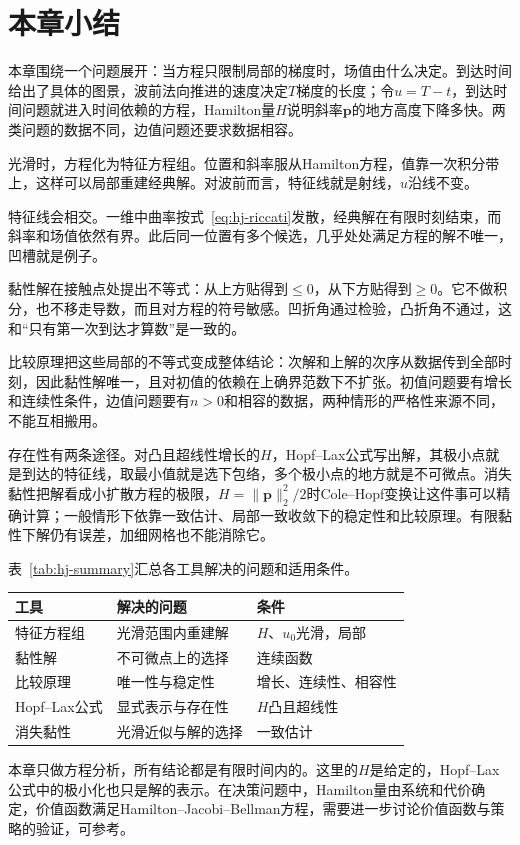 \section{本章小结}
\label{sec:hj-summary}

本章围绕一个问题展开：当方程只限制局部的梯度时，场值由什么决定。到达时间给出了具体的图景，波前法向推进的速度决定$T$梯度的长度；令$u=T-t$，到达时间问题就进入时间依赖的方程，Hamilton量$H$说明斜率$\bm{p}$的地方高度下降多快。两类问题的数据不同，边值问题还要求数据相容。

光滑时，方程化为特征方程组。位置和斜率服从Hamilton方程，值靠一次积分带上，这样可以局部重建经典解。对波前而言，特征线就是射线，$u$沿线不变。

特征线会相交。一维中曲率按式~\eqref{eq:hj-riccati}发散，经典解在有限时刻结束，而斜率和场值依然有界。此后同一位置有多个候选，几乎处处满足方程的解不唯一，凹槽就是例子。

黏性解在接触点处提出不等式：从上方贴得到$\leq0$，从下方贴得到$\geq0$。它不做积分，也不移走导数，而且对方程的符号敏感。凹折角通过检验，凸折角不通过，这和“只有第一次到达才算数”是一致的。

比较原理把这些局部的不等式变成整体结论：次解和上解的次序从数据传到全部时刻，因此黏性解唯一，且对初值的依赖在上确界范数下不扩张。初值问题要有增长和连续性条件，边值问题要有$n>0$和相容的数据，两种情形的严格性来源不同，不能互相搬用。

存在性有两条途径。对凸且超线性增长的$H$，Hopf--Lax公式写出解，其极小点就是到达的特征线，取最小值就是选下包络，多个极小点的地方就是不可微点。消失黏性把解看成小扩散方程的极限，$H=\lVert\bm{p}\rVert_2^2/2$时Cole--Hopf变换让这件事可以精确计算；一般情形下依靠一致估计、局部一致收敛下的稳定性和比较原理。有限黏性下解仍有误差，加细网格也不能消除它。

表~\ref{tab:hj-summary}汇总各工具解决的问题和适用条件。

\begin{BookInlineTable}
  \centering
  \begin{tabular}{lll}
    \toprule
    工具 & 解决的问题 & 条件\\
    \midrule
    特征方程组 & 光滑范围内重建解 & $H$、$u_0$光滑，局部\\
    黏性解 & 不可微点上的选择 & 连续函数\\
    比较原理 & 唯一性与稳定性 & 增长、连续性、相容性\\
    Hopf--Lax公式 & 显式表示与存在性 & $H$凸且超线性\\
    消失黏性 & 光滑近似与解的选择 & 一致估计\\
    \bottomrule
  \end{tabular}
  \caption{本章各工具的作用。}
  \label{tab:hj-summary}
\end{BookInlineTable}

本章只做方程分析，所有结论都是有限时间内的。这里的$H$是给定的，Hopf--Lax公式中的极小化也只是解的表示。在决策问题中，Hamilton量由系统和代价确定，价值函数满足Hamilton--Jacobi--Bellman方程，需要进一步讨论价值函数与策略的验证，可参考。
